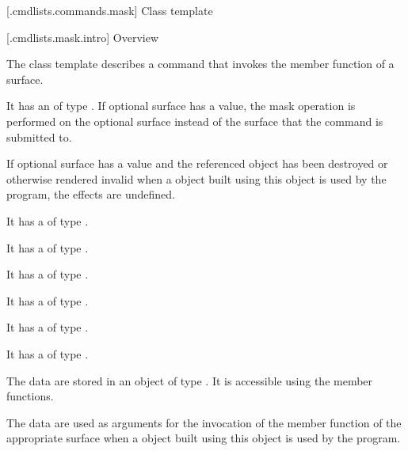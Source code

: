 
 [\iotwod.cmdlists.commands.mask] {Class template }

 [\iotwod.cmdlists.mask.intro] {Overview}

\pnum
{}%
The class template  describes a command that invokes the  member function of a surface.

\pnum
It has an  of type . If optional surface has a value, the mask operation is performed on the optional surface instead of the surface that the command is submitted to.

\pnum
If optional surface has a value and the referenced  object has been destroyed or otherwise rendered invalid when a  object built using this  object is used by the program, the effects are undefined.

\pnum
It has a  of type .

\pnum
It has a  of type .

\pnum
It has a  of type .

\pnum
It has a  of type .

\pnum
It has a  of type .

\pnum
It has a  of type .

\pnum
The data are stored in an object of type . It is accessible using the  member functions.

\pnum
The data are used as arguments for the invocation of the  member function of the appropriate surface when a  object built using this  object is used by the program.

